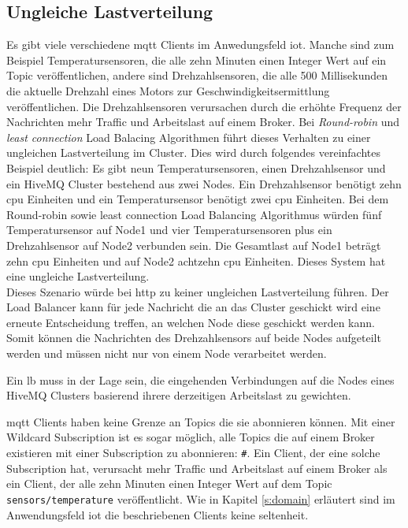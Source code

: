 \subsection{Ungleiche Lastverteilung}

Es gibt viele verschiedene \ac{mqtt} Clients im Anwedungsfeld \ac{iot}. Manche sind zum Beispiel Temperatursensoren, die alle zehn Minuten einen Integer Wert auf ein Topic veröffentlichen, andere sind Drehzahlsensoren, die alle 500 Millisekunden die aktuelle Drehzahl eines Motors zur Geschwindigkeitsermittlung veröffentlichen.
Die Drehzahlsensoren verursachen durch die erhöhte Frequenz der Nachrichten mehr Traffic und Arbeitslast auf einem Broker.
Bei \textit{Round-robin} und \textit{least connection} Load Balacing Algorithmen führt dieses Verhalten zu einer ungleichen Lastverteilung im Cluster. Dies wird durch folgendes vereinfachtes Beispiel deutlich:
Es gibt neun Temperatursensoren, einen Drehzahlsensor und ein HiveMQ Cluster bestehend aus zwei Nodes. Ein Drehzahlsensor benötigt zehn \ac{cpu} Einheiten und ein Temperatursensor benötigt zwei \ac{cpu} Einheiten. Bei dem Round-robin sowie least connection Load Balancing Algorithmus würden fünf Temperatursensor auf Node1 und vier Temperatursensoren plus ein Drehzahlsensor auf Node2 verbunden sein. Die Gesamtlast auf Node1 beträgt zehn \ac{cpu} Einheiten und auf Node2 achtzehn \ac{cpu} Einheiten. Dieses System hat eine ungleiche Lastverteilung.\\
Dieses Szenario würde bei \ac{http} zu keiner ungleichen Lastverteilung führen. Der Load Balancer kann für jede Nachricht die an das Cluster geschickt wird eine erneute Entscheidung treffen, an welchen Node diese geschickt werden kann. Somit können die Nachrichten des Drehzahlsensors auf beide Nodes aufgeteilt werden und müssen nicht nur von einem Node verarbeitet werden.



Ein \ac{lb} muss in der Lage sein, die eingehenden Verbindungen auf die Nodes eines HiveMQ Clusters basierend ihrere derzeitigen Arbeitslast zu gewichten.



\ac{mqtt} Clients haben keine Grenze an Topics die sie abonnieren können. Mit einer Wildcard Subscription ist es sogar möglich, alle Topics die auf einem Broker existieren mit einer Subscription zu abonnieren: \verb|#|. Ein Client, der eine solche Subscription hat, verursacht mehr Traffic und Arbeitslast auf einem Broker als ein Client, der alle zehn Minuten einen Integer Wert auf dem Topic \verb|sensors/temperature| veröffentlicht.
Wie in Kapitel \ref{s:domain} erläutert sind im Anwendungsfeld \ac{iot} die beschriebenen Clients keine seltenheit.


